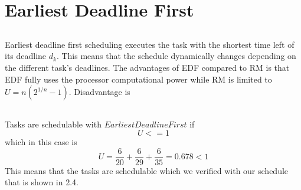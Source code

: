 \documentclass[12pt,a4paper]{article}
\begin{document}

\section{Earliest Deadline First}
\subsection{}
Earliest deadline first scheduling executes the task with the shortest time left of its deadline $d_k$. This means that the schedule dynamically changes depending on the different task's deadlines. The advantages of EDF compared to RM is that EDF fully uses the processor computational power while RM is limited to $U=n(2^{1/n}-1)$. Disadvantage is 

\subsection{} %
Tasks are schedulable with $Earliest Deadline First$ if 
\begin{equation}
U <= 1
\end{equation}
which in this case is
\begin{equation}
  U = \frac{6}{20}+\frac{6}{29}+\frac{6}{35}=0.678 < 1
\end{equation}
This means that the tasks are schedulable which we verified with our schedule that is shown in 2.4.
\end{document}
